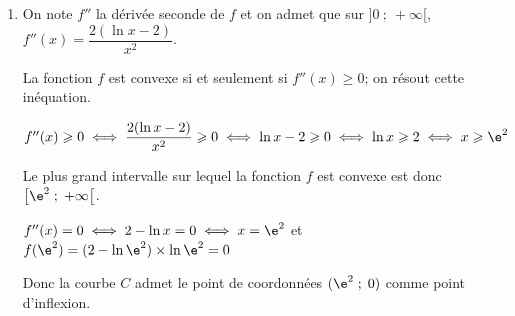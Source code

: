 \begin{enumerate}
\begin{enumerate}
	\end{enumerate}

	\item On note $f''$ la dérivée seconde de $f$ et on admet que sur $]0~;~+\infty[$, $f''(x) = \dfrac{2(\ln x-2)}{x^{2}}$.


La fonction $f$ est convexe si et seulement si $f''(x)\geqslant 0$; on résout cette inéquation.

$f''(x)\geqslant0
\iff
\dfrac{2(\ln x-2)}{x^{2}} \geqslant 0
\iff
\ln x - 2\geqslant 0
\iff
\ln x \geqslant 2
\iff
x\geqslant \e^{2}$

Le plus grand intervalle sur lequel la fonction $f$ est convexe est donc
$\left [  \e^{2}\;;\;+\infty\right [$.

$f''(x)=0 \iff 2-\ln x=0 \iff x=\e^{2}$ et
$f(\e^{2})=(2-\ln \e^{2})\times \ln \e^{2}=0$

Donc la courbe $C$ admet le point de coordonnées $(\e^{2}\;;\;0)$ comme point d'inflexion.

\end{enumerate}

\vspace{1cm}
